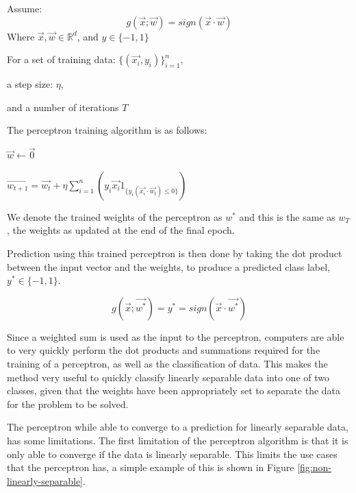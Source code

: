\documentclass[10pt,twocolumn,a4paper]{article}
\begin{document}
Assume:
\[ g(\vec{x}; \vec{w}) = sign(\vec{x} \cdot \vec{w}) \]
Where $ \vec{x},\vec{w} \in \mathbb{R}^d $, and $y \in \{-1, 1\} $

For a set of training data: $ \{(\vec{x_i}, y_i)\}_{i=1}^n $,

a step size: $\eta$,

and a number of iterations $T$

The perceptron training algorithm is as follows:
\begin{algorithmic}
\State $\vec{w} \gets \vec{0}$

    $\vec{w_{t+1}} = \vec{w_t} + \eta \sum_{i=1}^n(y_i \vec{x_i} 1_{\{ y_i (\vec{x_i} \cdot \vec{w_t}  ) \leq 0 \}})$
\EndFor
\end{algorithmic}

We denote the trained weights of the perceptron as $w^*$ and this is the same as $w_T$, the weights as updated at the end of the final epoch.

Prediction using this trained perceptron is then done by taking the dot product between the input vector and the weights, to produce a predicted class label, $y^* \in \{-1, 1\}$.

\[ g(\vec{x}; \vec{w^*}) = y^* = sign(\vec{x} \cdot \vec{w^*} ) \]

Since a weighted sum is used as the input to the perceptron, computers are able to very quickly perform the dot products and summations required for the training of a perceptron, as well as the classification of data. This makes the method very useful to quickly classify linearly separable data into one of two classes, given that the weights have been appropriately set to separate the data for the problem to be solved.

The perceptron while able to converge to a prediction for linearly separable data, has some limitations. The first limitation of the perceptron algorithm is that it is only able to converge if the data is linearly separable. This limits the use cases that the perceptron has, a simple example of this is shown in Figure \ref{fig:non-linearly-separable}.
\end{document}
